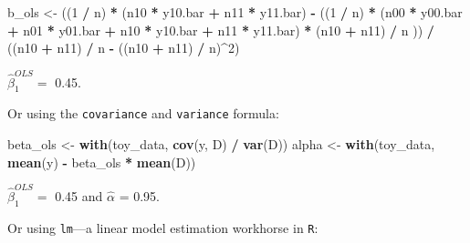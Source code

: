 \documentclass[
]{article}
\newenvironment{Shaded}{\begin{snugshade}}{\end{snugshade}}
\newcommand{\DecValTok}[1]{\textcolor[rgb]{0.00,0.00,0.81}{#1}}
\newcommand{\KeywordTok}[1]{\textcolor[rgb]{0.13,0.29,0.53}{\textbf{#1}}}
\newcommand{\NormalTok}[1]{#1}
\newcommand{\OperatorTok}[1]{\textcolor[rgb]{0.81,0.36,0.00}{\textbf{#1}}}
\newcommand{\StringTok}[1]{\textcolor[rgb]{0.31,0.60,0.02}{#1}}
\begin{document}
\begin{Shaded}
\begin{Highlighting}[]
\NormalTok{b\_ols \textless{}{-}}\StringTok{ }\NormalTok{((}\DecValTok{1} \OperatorTok{/}\StringTok{ }\NormalTok{n) }\OperatorTok{*}\StringTok{ }\NormalTok{(n10 }\OperatorTok{*}\StringTok{ }\NormalTok{y10.bar }\OperatorTok{+}\StringTok{ }\NormalTok{n11 }\OperatorTok{*}\StringTok{ }\NormalTok{y11.bar) }\OperatorTok{{-}}
\StringTok{  }\NormalTok{((}\DecValTok{1} \OperatorTok{/}\StringTok{ }\NormalTok{n) }\OperatorTok{*}\StringTok{ }\NormalTok{(n00 }\OperatorTok{*}\StringTok{ }\NormalTok{y00.bar }\OperatorTok{+}\StringTok{ }\NormalTok{n01 }\OperatorTok{*}\StringTok{ }\NormalTok{y01.bar }\OperatorTok{+}\StringTok{ }\NormalTok{n10 }\OperatorTok{*}\StringTok{ }\NormalTok{y10.bar }\OperatorTok{+}\StringTok{ }\NormalTok{n11 }\OperatorTok{*}\StringTok{ }\NormalTok{y11.bar) }\OperatorTok{*}\StringTok{ }\NormalTok{(n10 }\OperatorTok{+}\StringTok{ }\NormalTok{n11) }\OperatorTok{/}\StringTok{ }\NormalTok{n}
\NormalTok{  )) }\OperatorTok{/}
\StringTok{  }\NormalTok{((n10 }\OperatorTok{+}\StringTok{ }\NormalTok{n11) }\OperatorTok{/}\StringTok{ }\NormalTok{n }\OperatorTok{{-}}\StringTok{ }\NormalTok{((n10 }\OperatorTok{+}\StringTok{ }\NormalTok{n11) }\OperatorTok{/}\StringTok{ }\NormalTok{n)}\OperatorTok{\^{}}\DecValTok{2}\NormalTok{)}
\end{Highlighting}
\end{Shaded}

\(\hat{\beta}^{OLS}_1=\) 0.45.

Or using the \texttt{covariance} and \texttt{variance} formula:

\begin{Shaded}
\begin{Highlighting}[]
\NormalTok{beta\_ols \textless{}{-}}\StringTok{ }\KeywordTok{with}\NormalTok{(toy\_data, }\KeywordTok{cov}\NormalTok{(y, D) }\OperatorTok{/}\StringTok{ }\KeywordTok{var}\NormalTok{(D))}
\NormalTok{alpha \textless{}{-}}\StringTok{ }\KeywordTok{with}\NormalTok{(toy\_data, }\KeywordTok{mean}\NormalTok{(y) }\OperatorTok{{-}}\StringTok{ }\NormalTok{beta\_ols }\OperatorTok{*}\StringTok{ }\KeywordTok{mean}\NormalTok{(D))}
\end{Highlighting}
\end{Shaded}

\(\hat{\beta}^{OLS}_1=\) 0.45 and \(\hat\alpha\) = 0.95.

Or using \texttt{lm}---a linear model estimation workhorse in
\texttt{R}:

\begin{Shaded}
\end{Shaded}
\end{document}
